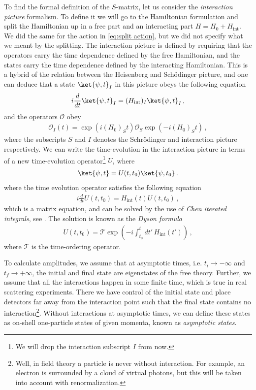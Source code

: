 To find the formal definition of the $S$-matrix, let us consider the \emph{interaction picture} formalism. To define it we will go to the Hamiltonian formulation and split the Hamiltonian up in a free part and an interacting part $H=H_{0}+H_{\text{int}}$. We did the same for the action in \cref{eq:split action}, but we did not specify what we meant by the splitting. The interaction picture is defined by requiring that the operators carry the time dependence defined by the free Hamiltonian, and the states carry the time dependence defined by the interacting Hamiltonian. This is a hybrid of the relation between the Heisenberg and Schödinger picture, and one can deduce that a state $\ket{\psi,t}_{I}$ in this picture obeys the following equation
\begin{align}
    i\frac{d}{dt}\ket{\psi,t}_{I}=(H_{\text{int}})_{I}\ket{\psi,t}_{I}\,,
\end{align}
and the operators $\mathcal{O}$ obey
\begin{align}
    \mathcal{O}_{I}(t)=\exp(i(H_{0})_{S}t)\mathcal{O}_{S}\exp(-i(H_{0})_{S}t)\,,
\end{align}
where the subscripts $S$ and $I$ denotes the Schrödinger and interaction picture respectively.
We can write the time-evolution in the interaction picture in terms of a new time-evolution operator\footnote{We will drop the interaction subscript $I$ from now.} $U$, where
\begin{align}
    \ket{\psi,t}=U(t,t_0)\ket{\psi,t_0}\,.
\end{align}
where the time evolution operator satisfies the following equation
\begin{align}
    i\frac{d}{dt}U(t,t_0)=H_{\text{int}}(t)U(t,t_0)\,,
\end{align}
which is a matrix equation, and can be solved by the use of \emph{Chen iterated integrals}, see \cite{chen1977}. The solution is known as the \emph{Dyson formula}
\begin{align}
    U(t,t_0)=\mathcal{T}\exp(-i\int_{t_0}^{t}dt'\,H_{\text{int}}(t'))\,,
\end{align}
where $\mathcal{T}$ is the time-ordering operator.

To calculate amplitudes, we assume that at asymptotic times, i.e. $t_{i}\rightarrow -\infty$ and $t_{f}\rightarrow +\infty$, the initial and final state are eigenstates of the free theory. Further, we assume that all the interactions happen in some finite time, which is true in real scattering experiments. There we have control of the initial state and place detectors far away from the interaction point such that the final state contains no interaction\footnote{Well, in field theory a particle is never  without interaction. For example, an electron is surrounded by a cloud of virtual photons, but this will be taken into account with renormalization.}. Without interactions at asymptotic times, we can define these states as on-shell one-particle states of given momenta, known as \emph{asymptotic states}. 

